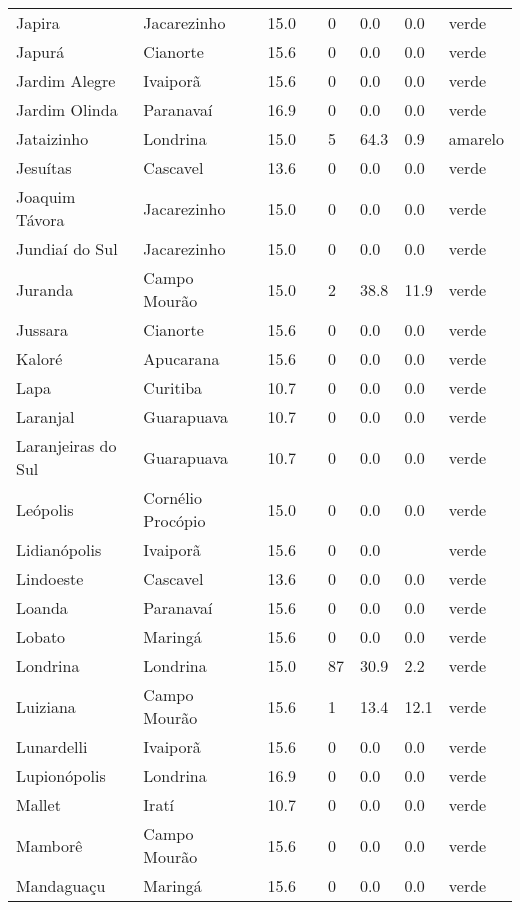 \begin{longtable}{l|lllllll}
  Japira & Jacarezinho & 15.0 &  & 0 & 0.0 & 0.0 & verde \\ 
  Japurá & Cianorte & 15.6 &  & 0 & 0.0 & 0.0 & verde \\ 
  Jardim Alegre & Ivaiporã & 15.6 &  & 0 & 0.0 & 0.0 & verde \\ 
  Jardim Olinda & Paranavaí & 16.9 &  & 0 & 0.0 & 0.0 & verde \\ 
  Jataizinho & Londrina & 15.0 &  & 5 & 64.3 & 0.9 & amarelo \\ 
  Jesuítas & Cascavel & 13.6 &  & 0 & 0.0 & 0.0 & verde \\ 
  Joaquim Távora & Jacarezinho & 15.0 &  & 0 & 0.0 & 0.0 & verde \\ 
  Jundiaí do Sul & Jacarezinho & 15.0 &  & 0 & 0.0 & 0.0 & verde \\ 
  Juranda & Campo Mourão & 15.0 &  & 2 & 38.8 & 11.9 & verde \\ 
  Jussara & Cianorte & 15.6 &  & 0 & 0.0 & 0.0 & verde \\ 
  Kaloré & Apucarana & 15.6 &  & 0 & 0.0 & 0.0 & verde \\ 
  Lapa & Curitiba & 10.7 &  & 0 & 0.0 & 0.0 & verde \\ 
  Laranjal & Guarapuava & 10.7 &  & 0 & 0.0 & 0.0 & verde \\ 
  Laranjeiras do Sul & Guarapuava & 10.7 &  & 0 & 0.0 & 0.0 & verde \\ 
  Leópolis & Cornélio Procópio & 15.0 &  & 0 & 0.0 & 0.0 & verde \\ 
  Lidianópolis & Ivaiporã & 15.6 &  & 0 & 0.0 &  & verde \\ 
  Lindoeste & Cascavel & 13.6 &  & 0 & 0.0 & 0.0 & verde \\ 
  Loanda & Paranavaí & 15.6 &  & 0 & 0.0 & 0.0 & verde \\ 
  Lobato & Maringá & 15.6 &  & 0 & 0.0 & 0.0 & verde \\ 
  Londrina & Londrina & 15.0 &  & 87 & 30.9 & 2.2 & verde \\ 
  Luiziana & Campo Mourão & 15.6 &  & 1 & 13.4 & 12.1 & verde \\ 
  Lunardelli & Ivaiporã & 15.6 &  & 0 & 0.0 & 0.0 & verde \\ 
  Lupionópolis & Londrina & 16.9 &  & 0 & 0.0 & 0.0 & verde \\ 
  Mallet & Iratí & 10.7 &  & 0 & 0.0 & 0.0 & verde \\ 
  Mamborê & Campo Mourão & 15.6 &  & 0 & 0.0 & 0.0 & verde \\ 
  Mandaguaçu & Maringá & 15.6 &  & 0 & 0.0 & 0.0 & verde \\ 

\end{longtable}
